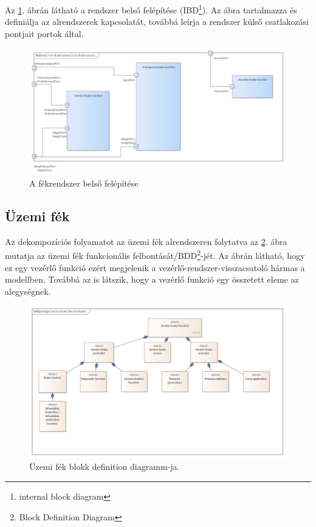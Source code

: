 Az \ref{fig:func_arch_ibd}. ábrán látható a rendszer belső felépítése (IBD\footnote{internal block diagram}).
Az ábra tartalmazza és definiálja az alrendszerek kapcsolatát, továbbá leírja a rendszer külső csatlakozási pontjait portok által.
\begin{figure}
    \footnotesize
    \centering
    \includegraphics[width=150mm, keepaspectratio]{figures/Architecture_ibd.png}
    \caption{A fékrendszer belső felépítése}
    \label{fig:func_arch_ibd}
\end{figure}

\subsection{Üzemi fék}
Az dekompozíciós folyamatot az üzemi fék alrendszeren folytatva az \ref{fig:service_brake_bdd}. ábra mutatja az üzemi fék funkcionális felbontását/BDD\footnote{Block Definition Diagram}-jét.
Az ábrán látható, hogy ez egy vezérlő funkció ezért megjelenik a vezérlő-rendszer-visszacsatoló hármas a modellben.
Továbbá az is látszik, hogy a vezérlő funkció egy összetett eleme az alegységnek.

\begin{figure}
    \footnotesize
    \centering
    \includegraphics[width=150mm, keepaspectratio]{figures/Service_Brake_bdd.png}
    \caption{Üzemi fék blokk definition diagramm-ja.}
    \label{fig:service_brake_bdd}
\end{figure}

